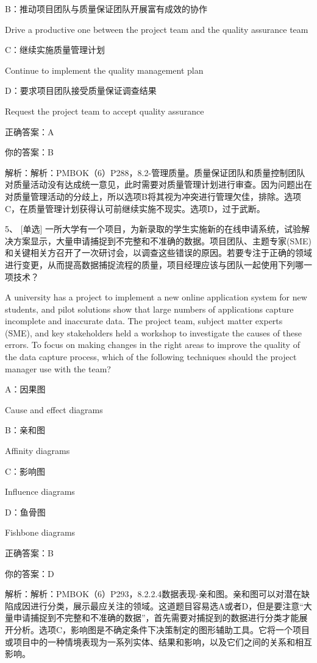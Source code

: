 B：推动项目团队与质量保证团队开展富有成效的协作

Drive a productive one between the project team and the quality assurance team

C：继续实施质量管理计划

Continue to implement the quality management plan

D：要求项目团队接受质量保证调查结果

Request the project team to accept quality assurance

正确答案：A

你的答案：B

解析：解析：PMBOK（6）P288，8.2-管理质量。质量保证团队和质量控制团队对质量活动没有达成统一意见，此时需要对质量管理计划进行审查。因为问题出在对质量管理活动的分歧上，所以选项B将其视为冲突进行管理欠佳，排除。选项C，在质量管理计划获得认可前继续实施不现实。选项D，过于武断。



5、 [单选] 一所大学有一个项目，为新录取的学生实施新的在线申请系统，试验解决方案显示，大量申请捕捉到不完整和不准确的数据。项目团队、主题专家(SME)和关键相关方召开了一次研讨会，以调查这些错误的原因。若要专注于正确的领域进行变更，从而提高数据捕捉流程的质量，项目经理应该与团队一起使用下列哪一项技术？

A university has a project to implement a new online application system for new students, and pilot solutions show that large numbers of applications capture incomplete and inaccurate data. The project team, subject matter experts (SME), and key stakeholders held a workshop to investigate the causes of these errors. To focus on making changes in the right areas to improve the quality of the data capture process, which of the following techniques should the project manager use with the team?

A：因果图

Cause and effect diagrams

B：亲和图

Affinity diagrams

C：影响图

Influence diagrams

D：鱼骨图

Fishbone diagrams

正确答案：B

你的答案：D

解析：解析：PMBOK（6）P293，8.2.2.4数据表现-亲和图。亲和图可以对潜在缺陷成因进行分类，展示最应关注的领域。这道题目容易选A或者D，但是要注意“大量申请捕捉到不完整和不准确的数据”，首先需要对捕捉到的数据进行分类才能展开分析。选项C，影响图是不确定条件下决策制定的图形辅助工具。它将一个项目或项目中的一种情境表现为一系列实体、结果和影响，以及它们之间的关系和相互影响。


